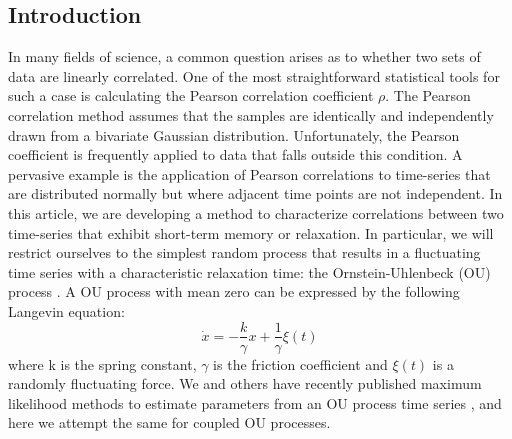 \documentclass[%
 reprint,
 amsmath,amssymb,
 aps,
]{revtex4-1}
\begin{document}
\maketitle

\onecolumngrid
\subsection{Introduction}
In many fields of science, a common question arises as to whether two sets of data are linearly correlated.  One of the most straightforward statistical tools for such a case is calculating the Pearson correlation coefficient $\rho$.  The Pearson correlation method assumes that the samples are identically and independently drawn from a bivariate Gaussian distribution.  Unfortunately, the Pearson coefficient is frequently applied to data that falls outside this condition. A pervasive example is the application of Pearson correlations to time-series that are distributed normally but where adjacent time points are not independent.  In this article, we are developing a method to characterize correlations between two time-series that exhibit short-term memory or relaxation.  In particular, we will restrict ourselves to the simplest random process that results in a fluctuating time series with a characteristic relaxation time: the Ornstein-Uhlenbeck (OU) process \cite{RN28}.  A OU process with mean zero can be expressed by the following Langevin equation:
\begin{equation}
\dot x =  - \frac{k}{\gamma }x + \frac{1}{\gamma }\xi(t)
\label{model}
\end{equation}
where k is the spring constant, $\gamma$ is the friction coefficient and $\xi(t)$ is a randomly fluctuating force.  
We and others have recently published maximum likelihood methods to estimate parameters from an OU process time series \cite{RN91,RN51,RN62}, and here we attempt the same for coupled OU processes.
\end{document}
